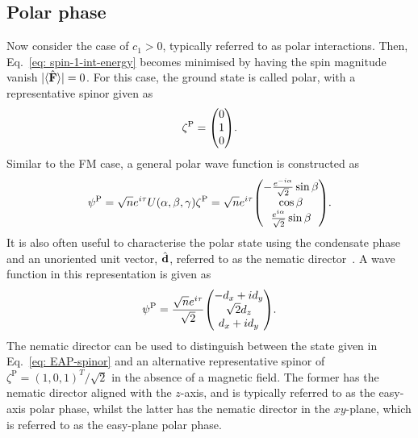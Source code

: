 \subsection{Polar phase}
Now consider the case of \(c_1 > 0\), typically referred to as polar
interactions.
Then, Eq.~\eqref{eq: spin-1-int-energy} becomes minimised by having the spin
magnitude vanish \(|\langle \hat{\vb{F}} \rangle |=0\).
For this case, the ground state is called polar, with a representative
spinor given as
\begin{equation}\label{eq: EAP-spinor}
    \zeta^\mathrm{P} = \mqty(0 \\ 1 \\ 0).
\end{equation}
Similar to the FM case, a general polar wave function is constructed as
\begin{equation}\label{eq: polar-representative-spinor}
    \psi^\mathrm{P} =
    \sqrt{n}e^{i\tau}U(\alpha, \beta, \gamma)\zeta^\mathrm{P} =
    \sqrt{n}e^{i\tau}\mqty(
    -\frac{e^{-i\alpha}}{\sqrt{2}}\sin\beta \\
    \cos\beta \\
    \frac{e^{i\alpha}}{\sqrt{2}}\sin\beta
    ).
\end{equation}
It is also often useful to characterise the polar state using the condensate
phase and an unoriented unit vector, \(\hat{\vb{d}}\), referred to as the
nematic director~\cite{Ruostekoski2003}.
A wave function in this representation is given as
\begin{align}
    \psi^\mathrm{P} = \frac{\sqrt{n}e^{i\tau}}{\sqrt{2}}
    \mqty(-d_x + id_y \\ \sqrt{2}d_z \\ d_x + id_y).
\end{align}
The nematic director can be used to distinguish between the state given in
Eq.~\eqref{eq: EAP-spinor} and an alternative representative spinor of
\(\zeta^\text{P} = {(1, 0, 1)}^T/\sqrt{2}\) in the absence of a magnetic field.
The former has the nematic director aligned with the \(z\)-axis, and is
typically referred to as the easy-axis polar phase, whilst the latter has the
nematic director in the \(xy\)-plane, which is referred to as the easy-plane
polar phase.

